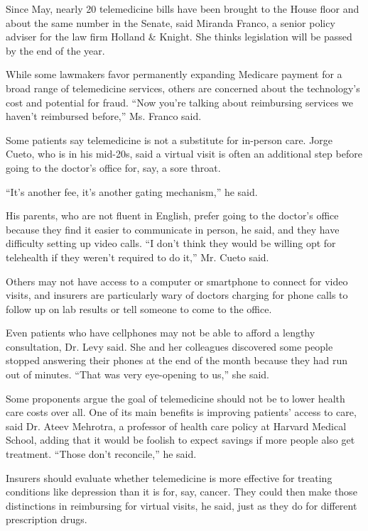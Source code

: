 Since May, nearly 20 telemedicine bills have been brought to the House
floor and about the same number in the Senate, said Miranda Franco, a
senior policy adviser for the law firm Holland \& Knight. She thinks
legislation will be passed by the end of the year.

While some lawmakers favor permanently expanding Medicare payment for a
broad range of telemedicine services, others are concerned about the
technology's cost and potential for fraud. ``Now you're talking about
reimbursing services we haven't reimbursed before,'' Ms. Franco said.

Some patients say telemedicine is not a substitute for in-person care.
Jorge Cueto, who is in his mid-20s, said a virtual visit is often an
additional step before going to the doctor's office for, say, a sore
throat.

``It's another fee, it's another gating mechanism,'' he said.

His parents, who are not fluent in English, prefer going to the doctor's
office because they find it easier to communicate in person, he said,
and they have difficulty setting up video calls. ``I don't think they
would be willing opt for telehealth if they weren't required to do it,''
Mr. Cueto said.

Others may not have access to a computer or smartphone to connect for
video visits, and insurers are particularly wary of doctors charging for
phone calls to follow up on lab results or tell someone to come to the
office.

Even patients who have cellphones may not be able to afford a lengthy
consultation, Dr. Levy said. She and her colleagues discovered some
people stopped answering their phones at the end of the month because
they had run out of minutes. ``That was very eye-opening to us,'' she
said.

Some proponents argue the goal of telemedicine should not be to lower
health care costs over all. One of its main benefits is improving
patients' access to care, said Dr. Ateev Mehrotra, a professor of health
care policy at Harvard Medical School, adding that it would be foolish
to expect savings if more people also get treatment. ``Those don't
reconcile,'' he said.

Insurers should evaluate whether telemedicine is more effective for
treating conditions like depression than it is for, say, cancer. They
could then make those distinctions in reimbursing for virtual visits, he
said, just as they do for different prescription drugs.

